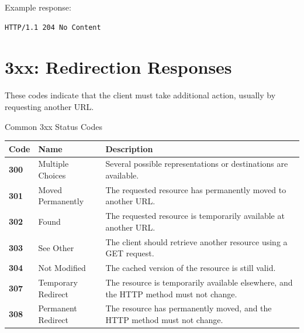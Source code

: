 \documentclass[a4paper]{article}
\begin{document}
                Example response:
            
            \begin{verbatim}
HTTP/1.1 204 No Content
                \end{verbatim}
    
    
    \section{3xx: Redirection Responses}
        
        These codes indicate that the client must take additional action, usually by
        requesting another URL.
        
        \begin{statuscategory}{Common 3xx Status Codes}
            \begin{longtable}{
                    >{\ttfamily\bfseries}p{1.5cm}
                p{4cm}
                p{8cm}
            }
                \toprule
                \textnormal{\textbf{Code}} &
                \textbf{Name} &
                \textbf{Description} \\
                \midrule
                300 &
                Multiple Choices &
                Several possible representations or destinations are available. \\
                
                301 &
                Moved Permanently &
                The requested resource has permanently moved to another URL. \\
                
                302 &
                Found &
                The requested resource is temporarily available at another URL. \\
                
                303 &
                See Other &
                The client should retrieve another resource using a GET request. \\
                
                304 &
                Not Modified &
                The cached version of the resource is still valid. \\
                
                307 &
                Temporary Redirect &
                The resource is temporarily available elsewhere, and the HTTP method must not
                change. \\
                
                308 &
                Permanent Redirect &
                The resource has permanently moved, and the HTTP method must not change. \\
                \bottomrule
            \end{longtable}
        \end{statuscategory}
    
\end{document}
